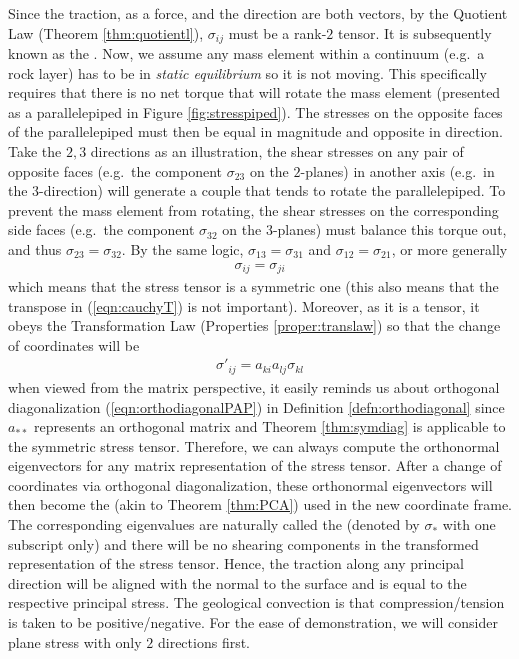 Since the traction, as a force, and the direction are both vectors, by the Quotient Law (Theorem \ref{thm:quotientl}), $\sigma_{ij}$ must be a rank-$2$ tensor. It is subsequently known as the . Now, we assume any mass element within a continuum (e.g.\ a rock layer) has to be in \textit{static equilibrium} so it is not moving. This specifically requires that there is no net torque that will rotate the mass element (presented as a parallelepiped in Figure \ref{fig:stresspiped}). The stresses on the opposite faces of the parallelepiped must then be equal in magnitude and opposite in direction. Take the $2,3$ directions as an illustration, the shear stresses on any pair of opposite faces (e.g.\ the component $\sigma_{23}$ on the $2$-planes) in another axis (e.g.\ in the $3$-direction) will generate a couple that tends to rotate the parallelepiped. To prevent the mass element from rotating, the shear stresses on the corresponding side faces (e.g.\ the component $\sigma_{32}$ on the $3$-planes) must balance this torque out, and thus $\sigma_{23} = \sigma_{32}$. By the same logic, $\sigma_{13} = \sigma_{31}$ and $\sigma_{12} = \sigma_{21}$, or more generally
\begin{align}
\sigma_{ij} = \sigma_{ji}
\end{align}
which means that the stress tensor is a symmetric one (this also means that the transpose in (\ref{eqn:cauchyT}) is not important). Moreover, as it is a tensor, it obeys the Transformation Law (Properties \ref{proper:translaw}) so that the change of coordinates will be
\begin{align}
\sigma'_{ij} = a_{ki}a_{lj}\sigma_{kl}
\end{align}
when viewed from the matrix perspective, it easily reminds us about orthogonal diagonalization (\ref{eqn:orthodiagonalPAP}) in Definition \ref{defn:orthodiagonal} since $a_{**}$ represents an orthogonal matrix and Theorem \ref{thm:symdiag} is applicable to the symmetric stress tensor. Therefore, we can always compute the orthonormal eigenvectors for any matrix representation of the stress tensor. After a change of coordinates via orthogonal diagonalization, these orthonormal eigenvectors will then become the  (akin to Theorem \ref{thm:PCA}) used in the new coordinate frame. The corresponding eigenvalues are naturally called the  (denoted by $\sigma_{*}$ with one subscript only) and there will be no shearing components in the transformed representation of the stress tensor. Hence, the traction along any principal direction will be aligned with the normal to the surface and is equal to the respective principal stress. The geological convection is that compression/tension is taken to be positive/negative. For the ease of demonstration, we will consider plane stress with only $2$ directions first.

